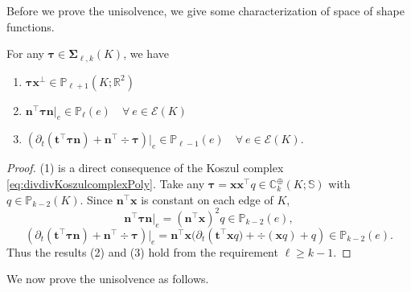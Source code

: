 Before we prove the unisolvence, we give some characterization of space of shape functions.
\begin{lemma}\label{lm:trace}
For any $\boldsymbol \tau\in\boldsymbol \Sigma_{\ell,k}(K)$, we have 
\begin{enumerate}
 \item $\boldsymbol \tau\boldsymbol x^{\perp} \in \mathbb P_{\ell+1}(K;\mathbb R^2)$ 
 
 \smallskip
 \item $\boldsymbol  n^{\intercal}\boldsymbol \tau\boldsymbol  n|_e\in\mathbb P_{\ell}(e)\quad\forall~e\in\mathcal E(K)$

\smallskip
 \item $(\partial_{t}(\boldsymbol  t^{\intercal}\boldsymbol \tau\boldsymbol  n)+\boldsymbol  n^{\intercal}\div\boldsymbol \tau)|_e\in\mathbb P_{\ell-1}(e)\quad\forall~e\in\mathcal E(K)$.
\end{enumerate}
%
%
\end{lemma}
\begin{proof}
(1) is a direct consequence of the Koszul complex \eqref{eq:divdivKoszulcomplexPoly}. 
Take any $\boldsymbol \tau=\boldsymbol  x\boldsymbol  x^{\intercal}q\in\mathbb C_k^{\oplus}(K;\mathbb S)$ with $q\in\mathbb P_{k-2}(K)$.
Since $\boldsymbol  n^{\intercal}\boldsymbol  x$ is constant on each edge of $K$,
\[
 \boldsymbol  n^{\intercal}\boldsymbol \tau\boldsymbol  n|_e=(\boldsymbol  n^{\intercal}\boldsymbol  x)^2q\in\mathbb P_{k-2}(e),
\]
\[
 (\partial_{t}(\boldsymbol  t^{\intercal}\boldsymbol \tau\boldsymbol  n)+\boldsymbol  n^{\intercal}\div\boldsymbol \tau)|_e=\boldsymbol  n^{\intercal}\boldsymbol  x(\partial_{t}\left(\boldsymbol  t^{\intercal}\boldsymbol x q)+\div(\boldsymbol  x q)+q\right)\in\mathbb P_{k-2}(e).
\]
Thus the results (2) and (3) hold from the requirement $\ell\geq k-1$.
\end{proof}


We now prove the unisolvence as follows.

